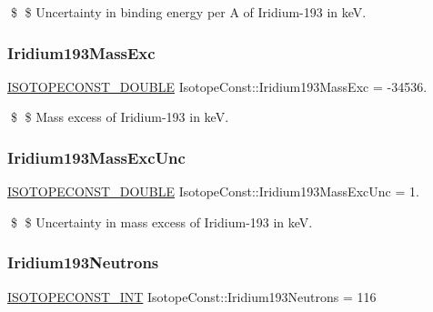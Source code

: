 \$ \$ Uncertainty in binding energy per A of Iridium-\/193 in keV. \mbox{\label{group___isotope_const-_iridium-_ir193_ga4f3667c0eb9abe38defcf38acb5f50fe}} 
\subsubsection{\texorpdfstring{Iridium193\+Mass\+Exc}{Iridium193MassExc}}
{\footnotesize\ttfamily \mbox{\hyperlink{group___isotope_const-_macros_ga8f45a7272ce02c0b4c65c44636ed719a}{I\+S\+O\+T\+O\+P\+E\+C\+O\+N\+S\+T\+\_\+\+D\+O\+U\+B\+LE}} Isotope\+Const\+::\+Iridium193\+Mass\+Exc = -\/34536.}

\$ \$ Mass excess of Iridium-\/193 in keV. \mbox{\label{group___isotope_const-_iridium-_ir193_ga2fc469bb12aa7cb4fec55f9d89197052}} 
\subsubsection{\texorpdfstring{Iridium193\+Mass\+Exc\+Unc}{Iridium193MassExcUnc}}
{\footnotesize\ttfamily \mbox{\hyperlink{group___isotope_const-_macros_ga8f45a7272ce02c0b4c65c44636ed719a}{I\+S\+O\+T\+O\+P\+E\+C\+O\+N\+S\+T\+\_\+\+D\+O\+U\+B\+LE}} Isotope\+Const\+::\+Iridium193\+Mass\+Exc\+Unc = 1.}

\$ \$ Uncertainty in mass excess of Iridium-\/193 in keV. \mbox{\label{group___isotope_const-_iridium-_ir193_ga9f6bf9cdfd2f34d881bd28da006b966d}} 
\subsubsection{\texorpdfstring{Iridium193\+Neutrons}{Iridium193Neutrons}}
{\footnotesize\ttfamily \mbox{\hyperlink{group___isotope_const-_macros_ga5f18360b3e99483a35c32d789e62621c}{I\+S\+O\+T\+O\+P\+E\+C\+O\+N\+S\+T\+\_\+\+I\+NT}} Isotope\+Const\+::\+Iridium193\+Neutrons = 116}

